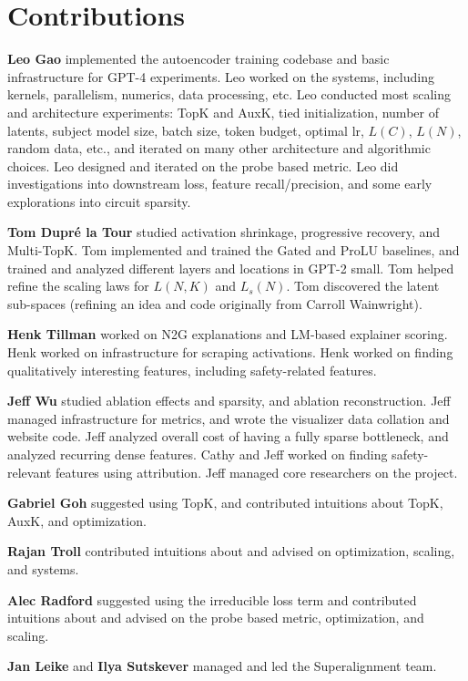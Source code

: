 \ifpreprint
\clearpage %
\section{Contributions}
\label{sec:contributions}

\textbf{Leo Gao} implemented the autoencoder training codebase and basic infrastructure for GPT-4 experiments.  Leo worked on the systems, including kernels, parallelism, numerics, data processing, etc.  Leo conducted most scaling and architecture experiments:  TopK and AuxK, tied initialization, number of latents, subject model size, batch size, token budget, optimal lr, $L(C)$, $L(N)$, random data, etc., and iterated on many other architecture and algorithmic choices. Leo designed and iterated on the probe based metric. Leo did investigations into downstream loss, feature recall/precision, and some early explorations into circuit sparsity.

\textbf{Tom Dupr\'e la Tour} studied activation shrinkage, progressive recovery, and Multi-TopK.  Tom implemented and trained the Gated and ProLU baselines, and trained and analyzed different layers and locations in GPT-2 small.  Tom helped refine the scaling laws for $L(N, K)$ and $L_s(N)$.  Tom discovered the latent sub-spaces (refining an idea and code originally from Carroll Wainwright).

\textbf{Henk Tillman} worked on N2G explanations and LM-based explainer scoring. Henk worked on infrastructure for scraping activations. Henk worked on finding qualitatively interesting features, including safety-related features.

\textbf{Jeff Wu} studied ablation effects and sparsity, and ablation reconstruction.  Jeff managed infrastructure for metrics, and wrote the visualizer data collation and website code.  Jeff analyzed overall cost of having a fully sparse bottleneck, and analyzed recurring dense features.  Cathy and Jeff worked on finding safety-relevant features using attribution.  Jeff managed core researchers on the project. 

\textbf{Gabriel Goh} suggested using TopK, and contributed intuitions about TopK, AuxK, and optimization.  

\textbf{Rajan Troll} contributed intuitions about and advised on optimization, scaling, and systems.


\textbf{Alec Radford} suggested using the irreducible loss term and contributed intuitions about and advised on the probe based metric, optimization, and scaling.

\textbf{Jan Leike} and \textbf{Ilya Sutskever} managed and led the Superalignment team. %

\fi
